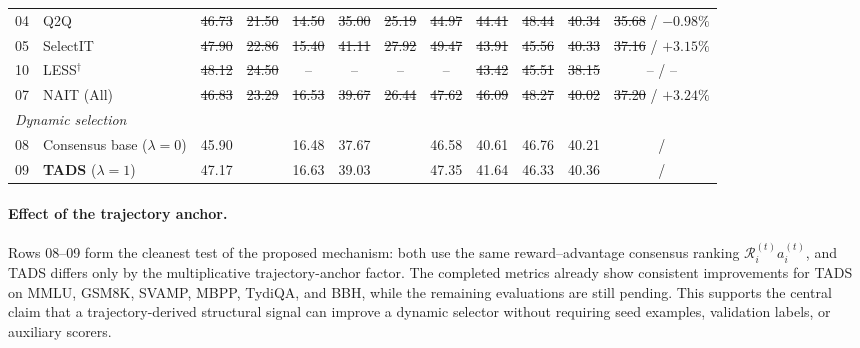 \begin{table}[t]
\begin{tabular}{llcccccccccc}
04 & Q2Q                
& \sout{46.73} & \sout{21.50} & \sout{14.50} & \sout{35.00} 
& \sout{25.19} & \sout{44.97} & \sout{44.41} & \sout{48.44} 
& \sout{40.34} & \sout{35.68} / \sout{$-0.98\%$} \\

05 & SelectIT           
& \sout{47.90} & \sout{22.86} & \sout{15.40} & \sout{41.11} 
& \sout{27.92} & \sout{49.47} & \sout{43.91} & \sout{45.56} 
& \sout{40.33} & \sout{37.16} / \sout{$+3.15\%$} \\

10 & LESS$^{\dagger}$   
& \sout{48.12} & \sout{24.50} & -- & -- 
& -- & -- & \sout{43.42} & \sout{45.51} 
& \sout{38.15} & -- / -- \\

07 & NAIT (All)         
& \sout{46.83} & \sout{23.29} & \sout{16.53} & \sout{39.67} 
& \sout{26.44} & \sout{47.62} & \sout{46.09} & \sout{48.27} 
& \sout{40.02} & \sout{37.20} / \sout{$+3.24\%$} \\

\midrule
\midrule
\multicolumn{12}{l}{\textit{Dynamic selection}}\\
08 & Consensus base ($\lambda=0$) 
& 45.90 & \STATUS{??.??} & 16.48 & 37.67 
& \STATUS{??.??} & 46.58 & 40.61 & 46.76 
& 40.21 & \STATUS{??.??} / \STATUS{?} \\

09 & \textbf{TADS} ($\lambda=1$) 
& 47.17 & \STATUS{??.??} & 16.63 & 39.03 
& \STATUS{??.??} & 47.35 & 41.64 & 46.33 
& 40.36 & \STATUS{??.??} / \STATUS{?} \\

\bottomrule
\end{tabular}
\end{table}

\paragraph{Effect of the trajectory anchor.}
Rows 08--09 form the cleanest test of the proposed mechanism: both
use the same reward--advantage consensus ranking
$\mathcal{R}_i^{(t)}a_i^{(t)}$, and \textsc{TADS} differs only by the
multiplicative trajectory-anchor factor. The completed metrics
already show consistent improvements for \textsc{TADS} on MMLU,
GSM8K, SVAMP, MBPP, TydiQA, and BBH, while the remaining
evaluations are still pending. This supports the central claim that
a trajectory-derived structural signal can improve a dynamic
selector without requiring seed examples, validation labels, or
auxiliary scorers.

